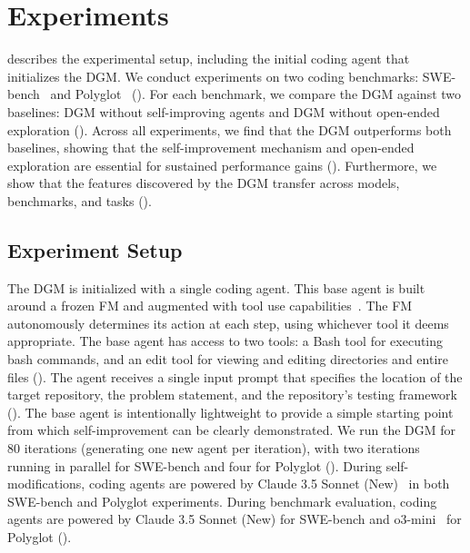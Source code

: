 \section{Experiments}
\label{sec:experiments}

 describes the experimental setup, including the initial coding agent that initializes the DGM. We conduct experiments on two coding benchmarks: SWE-bench~\citep{jimenez2024swebench} and Polyglot~\citep{gauthier2024polyglot} (). For each benchmark, we compare the DGM against two baselines: DGM without self-improving agents and DGM without open-ended exploration (). Across all experiments, we find that the DGM outperforms both baselines, showing that the self-improvement mechanism and open-ended exploration are essential for sustained performance gains (). Furthermore, we show that the features discovered by the DGM transfer across models, benchmarks, and tasks ().

\subsection{Experiment Setup}
\label{sec:experiment-setup}

The DGM is initialized with a single coding agent. This base agent is built around a frozen FM and augmented with tool use capabilities~\citep{schick2023toolformer, anthropic_tool_use_2024}. The FM autonomously determines its action at each step, using whichever tool it deems appropriate. The base agent has access to two tools: a Bash tool for executing bash commands, and an edit tool for viewing and editing directories and entire files (). The agent receives a single input prompt that specifies the location of the target repository, the problem statement, and the repository's testing framework (). The base agent is intentionally lightweight to provide a simple starting point from which self-improvement can be clearly demonstrated. We run the DGM for 80 iterations (generating one new agent per iteration), with two iterations running in parallel for SWE-bench and four for Polyglot (). During self-modifications, coding agents are powered by Claude 3.5 Sonnet (New)~\citep{anthropic2024claude35sonnet} in both SWE-bench and Polyglot experiments. During benchmark evaluation, coding agents are powered by Claude 3.5 Sonnet (New) for SWE-bench and o3-mini~\citep{openai2025o3mini} for Polyglot ().

